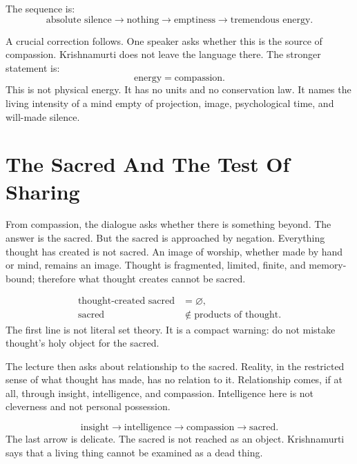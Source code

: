 \documentclass[11pt,oneside]{book}
\begin{document}
The sequence is:
\begin{equation}
\text{absolute silence}
\longrightarrow
\text{nothing}
\longrightarrow
\text{emptiness}
\longrightarrow
\text{tremendous energy}.
\end{equation}

A crucial correction follows. One speaker asks whether this is the source of compassion. Krishnamurti does not leave the language there. The stronger statement is:
\begin{equation}
\text{energy} = \text{compassion}.
\end{equation}
This is not physical energy. It has no units and no conservation law. It names the living intensity of a mind empty of projection, image, psychological time, and will-made silence.

\section{The Sacred And The Test Of Sharing}

From compassion, the dialogue asks whether there is something beyond. The answer is the sacred. But the sacred is approached by negation. Everything thought has created is not sacred. An image of worship, whether made by hand or mind, remains an image. Thought is fragmented, limited, finite, and memory-bound; therefore what thought creates cannot be sacred.

\begin{align}
\text{thought-created sacred} &= \varnothing,\\
\text{sacred} &\notin \text{products of thought}.
\end{align}
The first line is not literal set theory. It is a compact warning: do not mistake thought's holy object for the sacred.

The lecture then asks about relationship to the sacred. Reality, in the restricted sense of what thought has made, has no relation to it. Relationship comes, if at all, through insight, intelligence, and compassion. Intelligence here is not cleverness and not personal possession.

\begin{equation}
\text{insight}
\longrightarrow
\text{intelligence}
\longrightarrow
\text{compassion}
\longrightarrow
\text{sacred}.
\end{equation}
The last arrow is delicate. The sacred is not reached as an object. Krishnamurti says that a living thing cannot be examined as a dead thing.
\end{document}
